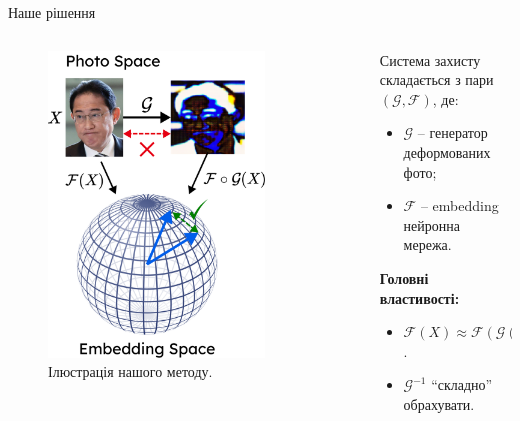 \documentclass[xcolor={usenames,dvipsnames}]{beamer}
\begin{document}
    \begin{frame}{Наше рішення}
        \begin{columns}
        \begin{column}{0.5\textwidth}
        \begin{figure}
        \centering
            \includegraphics[width=0.8\textwidth]{images/our_approach.png}
            \caption{Ілюстрація нашого методу.}
        \end{figure}
        \end{column}

        \begin{column}{0.5\textwidth}
            Система захисту складається з пари $(\mathcal{G},\mathcal{F})$, де:
            \begin{itemize}
                \item $\mathcal{G}$ -- генератор деформованих фото;
                \item $\mathcal{F}$ -- embedding нейронна мережа.
            \end{itemize}
            \textbf{Головні властивості:}
            \begin{itemize}
                \item $\mathcal{F}(X) \approx \mathcal{F}(\mathcal{G}(X))$. 
                \item $\mathcal{G}^{-1}$ ``складно'' обрахувати.
            \end{itemize}
        \end{column}
    \end{columns}
    \end{frame}
\end{document}
